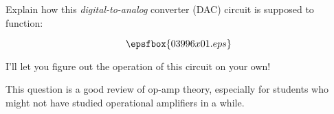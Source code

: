 

Explain how this {\it digital-to-analog} converter (DAC) circuit is supposed to function:

$$\epsfbox{03996x01.eps}$$







I'll let you figure out the operation of this circuit on your own!







This question is a good review of op-amp theory, especially for students who might not have studied operational amplifiers in a while.




